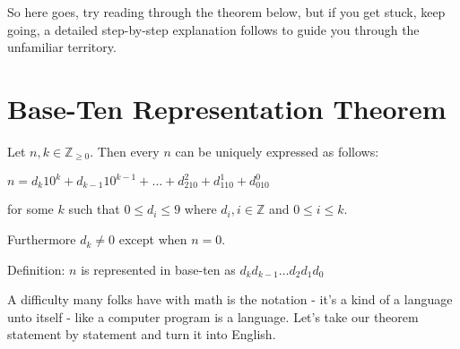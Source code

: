 \documentclass{article}
\newenvironment{jprIn}{\begin{adjustwidth}{2em}{}}{\end{adjustwidth}}
\begin{document}
So here goes, try reading through the theorem below, but if you get stuck, keep
going, a detailed step-by-step explanation follows to guide you through the unfamiliar territory.

\section*{Base-Ten Representation Theorem}

\begin{jprIn}
Let $n,k\in \mathbb{Z}_{\ge 0}$. Then every $n$ can be uniquely expressed as follows:

\hspace{3em}$n=d_k10^k+d_{k-1}10^{k-1}+\dots+d_210^2+d_110^1+d_010^0$

for some $k$ such that $0 \le d_i \le 9$ where $d_i,i\in\mathbb{Z}$ and $0 \le i \le k$.

Furthermore $d_k\ne0$ except when $n=0$.

Definition: $n$ is represented in base-ten as $d_kd_{k-1}\dots{}d_2d_1d_0$
\end{jprIn}
\bigskip

A difficulty many folks have with math is the notation - it's
a kind of a language unto itself - like a computer program is a language.
Let's take our theorem statement by statement and turn it into English.
\end{document}
